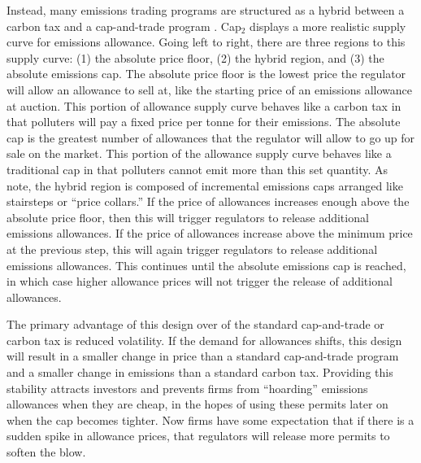 Instead, many emissions trading programs are structured as a hybrid between a carbon tax and a cap-and-trade program \citep{schmalensee2017lessons}. Cap$_2$ displays a more realistic supply curve for emissions allowance. Going left to right, there are three regions to this supply curve: (1) the absolute price floor, (2) the hybrid region, and (3) the absolute emissions cap. The absolute price floor is the lowest price the regulator will allow an allowance to sell at, like the starting price of an emissions allowance at auction. This portion of allowance supply curve behaves like a carbon tax in that polluters will pay a fixed price per tonne for their emissions. The absolute cap is the greatest number of allowances that the regulator will allow to go up for sale on the market. This portion of the allowance supply curve behaves like a traditional cap in that polluters cannot emit more than this set quantity. 
As \cite{schmalensee2017lessons} note, the hybrid region is composed of incremental emissions caps arranged like stairsteps or ``price collars.'' If the price of allowances increases enough above the absolute price floor, then this will trigger regulators to release additional emissions allowances. If the price of allowances increase above the minimum price at the previous step, this will again trigger regulators to release additional emissions allowances. This continues until the absolute emissions cap is reached, in which case higher allowance prices will not trigger the release of additional allowances.

The primary advantage of this design over of the standard cap-and-trade or carbon tax is reduced volatility. If the demand for allowances shifts, this design will result in a smaller change in price than a standard cap-and-trade program and a smaller change in emissions than a standard carbon tax. Providing this stability attracts investors and prevents firms from ``hoarding'' emissions allowances when they are cheap, in the hopes of using these permits later on when the cap becomes tighter. Now firms have some expectation that if there is a sudden spike in allowance prices, that regulators will release more permits to soften the blow. 


